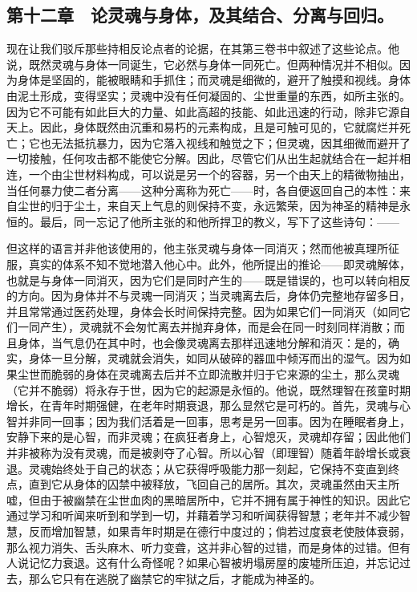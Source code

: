 \subsection{第十二章　论灵魂与身体，及其结合、分离与回归。}

现在让我们驳斥那些持相反论点者的论据，在其第三卷书中叙述了这些论点。他说，既然灵魂与身体一同诞生，它必然与身体一同死亡。但两种情况并不相似。因为身体是坚固的，能被眼睛和手抓住；而灵魂是细微的，避开了触摸和视线。身体由泥土形成，变得坚实；灵魂中没有任何凝固的、尘世重量的东西，如所主张的。因为它不可能有如此巨大的力量、如此高超的技能、如此迅速的行动，除非它源自天上。因此，身体既然由沉重和易朽的元素构成，且是可触可见的，它就腐烂并死亡；它也无法抵抗暴力，因为它落入视线和触觉之下；但灵魂，因其细微而避开了一切接触，任何攻击都不能使它分解。因此，尽管它们从出生起就结合在一起并相连，一个由尘世材料构成，可以说是另一个的容器，另一个由天上的精微物抽出，当任何暴力使二者分离——这种分离称为死亡——时，各自便返回自己的本性：来自尘世的归于尘土，来自天上气息的则保持不变，永远繁荣，因为神圣的精神是永恒的。最后，同一忘记了他所主张的和他所捍卫的教义，写下了这些诗句：——\par

\par

但这样的语言并非他该使用的，他主张灵魂与身体一同消灭；然而他被真理所征服，真实的体系不知不觉地潜入他心中。此外，他所提出的推论——即灵魂解体，也就是与身体一同消灭，因为它们是同时产生的——既是错误的，也可以转向相反的方向。因为身体并不与灵魂一同消灭；当灵魂离去后，身体仍完整地存留多日，并且常常通过医药处理，身体会长时间保持完整。因为如果它们一同消灭（如同它们一同产生），灵魂就不会匆忙离去并抛弃身体，而是会在同一时刻同样消散；而且身体，当气息仍在其中时，也会像灵魂离去那样迅速地分解和消灭：是的，确实，身体一旦分解，灵魂就会消失，如同从破碎的器皿中倾泻而出的湿气。因为如果尘世而脆弱的身体在灵魂离去后并不立即流散并归于它来源的尘土，那么灵魂（它并不脆弱）将永存于世，因为它的起源是永恒的。他说，既然理智在孩童时期增长，在青年时期强健，在老年时期衰退，那么显然它是可朽的。首先，灵魂与心智并非同一回事；因为我们活着是一回事，思考是另一回事。因为在睡眠者身上，安静下来的是心智，而非灵魂；在疯狂者身上，心智熄灭，灵魂却存留；因此他们并非被称为没有灵魂，而是被剥夺了心智。所以心智（即理智）随着年龄增长或衰退。灵魂始终处于自己的状态；从它获得呼吸能力那一刻起，它保持不变直到终点，直到它从身体的囚禁中被释放，飞回自己的居所。其次，灵魂虽然由天主所嘘，但由于被幽禁在尘世血肉的黑暗居所中，它并不拥有属于神性的知识。因此它通过学习和听闻来听到和学到一切，并藉着学习和听闻获得智慧；老年并不减少智慧，反而增加智慧，如果青年时期是在德行中度过的；倘若过度衰老使肢体衰弱，那么视力消失、舌头麻木、听力变聋，这并非心智的过错，而是身体的过错。但有人说记忆力衰退。这有什么奇怪呢？如果心智被坍塌房屋的废墟所压迫，并忘记过去，那么它只有在逃脱了幽禁它的牢狱之后，才能成为神圣的。\par

